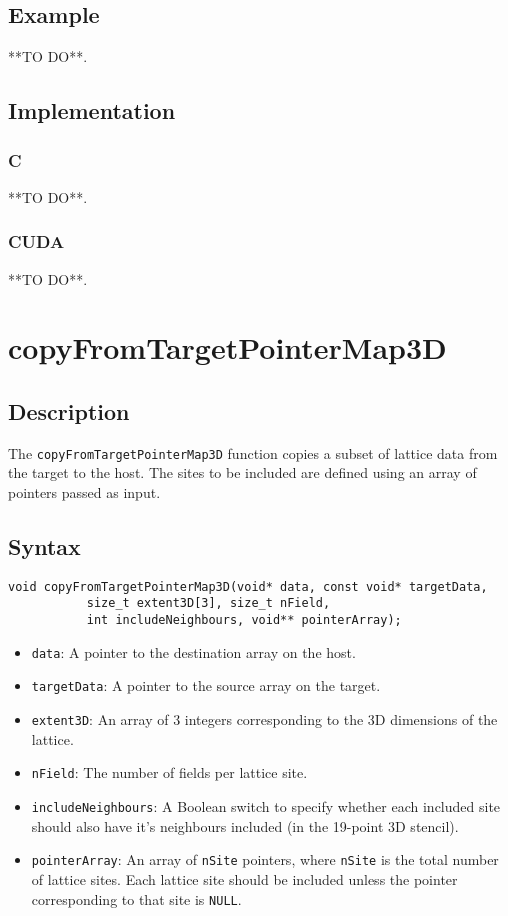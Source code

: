\subsection{Example}
**TO DO**.
\subsection{Implementation}
\subsubsection{C}
**TO DO**.
\subsubsection{CUDA}
**TO DO**.

\newpage
\section{copyFromTargetPointerMap3D}

\subsection{Description}

The \verb+copyFromTargetPointerMap3D+ function copies a subset of lattice data from the target to the host. The sites to be included are defined using an array of pointers passed as input.

\subsection{Syntax}
\begin{verbatim}
void copyFromTargetPointerMap3D(void* data, const void* targetData, 
           size_t extent3D[3], size_t nField, 
           int includeNeighbours, void** pointerArray);
\end{verbatim}

\begin{itemize}
\item \verb+data+: A pointer to the destination array on the host.
\item \verb+targetData+: A pointer to the source array on the target.
\item \verb+extent3D+: An array of 3 integers corresponding to the 3D dimensions of the lattice.
\item \verb+nField+: The number of fields per lattice site.
\item \verb+includeNeighbours+: A Boolean switch to specify whether each included site should also have it's neighbours included (in the 19-point 3D stencil).
\item \verb+pointerArray+: An array of \verb+nSite+ pointers, where \verb+nSite+ is the total number of lattice sites. Each lattice site should be included unless the pointer corresponding to that site is \verb+NULL+.  
\end{itemize}


